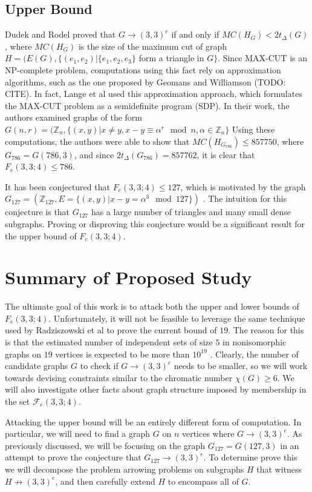 \documentclass[paper=a4, fontsize=11pt]{scrartcl} %
\begin{document}
\subsection{Upper Bound}
Dudek and Rodel proved that $G \to (3,3)^e$ if and only if $MC(H_G) < 2t_{\Delta}(G)$ \cite{dudek08},
where $MC(H_G)$ is the size of the maximum cut of graph $H = (E(G), \{(e_1, e_2) | \{e_1, e_2, e_3\}$ form a triangle
in $G\}$. Since MAX-CUT is an NP-complete problem, computations using this fact rely on approximation
algorithms, such as the one proposed by Geomans and Williamson (TODO: CITE). In fact, Lange et al \cite{arlFolkman}
used this approximation approach, which formulates the MAX-CUT problem as a semidefinite program (SDP).
In their work, the authors examined graphs of the form 
$G(n, r) = (\mathbb{Z}_{n}, \{(x,y) | x \not= y, x - y \equiv \alpha^r \mod n, \alpha \in \mathbb{Z}_{n}\}$
Using these computations, the authors were able to show that $MC(H_{G_{786}}) \leq 857750$, where
$G_{786} = G(786, 3)$, and since $2t_{\Delta}(G_{786}) = 857762$, it is clear that $F_e(3,3;4) \leq 786$. 

It has been conjectured that $F_e(3,3;4) \leq 127$, which is motivated by the graph 
$G_{127} = (\mathbb{Z}_{127}, E = \{(x,y) | x - y = \alpha^3 \mod 127\})$ \cite{spr07}.
The intuition for this conjecture is that $G_{127}$ has a large number of triangles and many small dense subgraphs.
Proving or disproving this conjecture would be a significant result for the upper bound of
$F_e(3,3;4)$.

\section{Summary of Proposed Study}
The ultimate goal of this work is to attack both the upper and lower bounds of $F_e(3,3;4)$. 
Unfortunately, it will not be feasible to leverage the same technique used by Radziszowski 
et al to prove the current bound of $19$. The reason for this is that the estimated number of independent
sets of size $5$ in nonisomorphic graphs on $19$ vertices is expected to be more than $10^{19}$ \cite{spr1995}.
Clearly, the number of candidate graphs $G$ to check if $G \to (3,3)^e$ needs to be smaller, so we will
work towards devising constraints similar to the chromatic number $\chi(G) \geq 6$. We will also investigate
other facts about graph structure imposed by membership in the set $\mathcal{F}_e(3,3;4)$. 

Attacking the upper bound will be an entirely different form of computation. In particular, we will need to find a 
graph $G$ on $n$ vertices where $G \to (3,3)^e$. As previously discussed, we will be focusing on the graph 
$G_{127} = G(127,3)$ in an attempt to prove the conjecture that $G_{127} \to (3,3)^e$. 
To determine prove this we will decompose the problem arrowing problems on subgraphs $H$ that 
witness $H \not \to (3,3)^e$, and then carefully extend $H$ to encompass all of $G$. 
\end{document}
